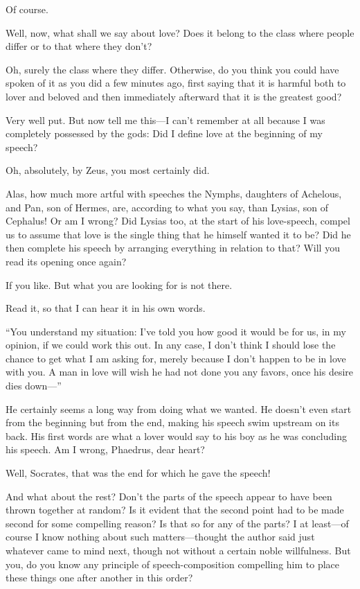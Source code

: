 \sayphaedrus Of course.

\saysocrates Well, now, what shall we say about love? Does it belong to the
class where people differ or to that where they don't?

\sayphaedrus Oh, surely the class where they differ. Otherwise, do you
think you could have spoken of it as you did a few minutes ago, first
saying that it is harmful both to lover and beloved and then immediately
afterward that it is the greatest good?

\saysocrates Very well put. But now tell me this---I can't remember
at all because I was completely possessed by the gods: Did I define love
at the beginning of my speech?

\sayphaedrus Oh, absolutely, by Zeus, you most certainly did.

\saysocrates Alas, how much more artful with speeches the Nymphs, daughters
of Achelous, and Pan, son of Hermes, are, according to what you say,
than Lysias, son of Cephalus! Or am I wrong? Did Lysias too, at 
the start of his love-speech, compel us to assume that love is the
single thing that he himself wanted it to be? Did he then complete his
speech by arranging everything in relation to that? Will you read its
opening once again?

\sayphaedrus If you like. But what you are looking for is not there.

\saysocrates Read it, so that I can hear it in his own words.

\sayphaedrus “You understand my situation: I've told you how good it would
be for us, in my opinion, if we could work this out. In any case, I
don't think I should lose the chance to get what I am asking for, merely
because I don't happen to be in love with you. A man in
love will wish he had not done you any favors, once his desire dies
down---”

\saysocrates He certainly seems a long way from doing what we wanted. He
doesn't even start from the beginning but from the end, making his
speech swim upstream on its back. His first words are what a lover would
say to his boy as he was concluding his speech. Am I wrong, Phaedrus,
dear heart?

\sayphaedrus Well, Socrates, that was the end for which he gave the speech!

\saysocrates And what about the rest? Don't the parts of the speech appear
to have been thrown together at random? Is it evident that the second
point had to be made second for some compelling reason? Is that so for
any of the parts? I at least---of course I know nothing about such
matters---thought the author said just whatever came to mind next,
though not without a certain noble willfulness. But you, do you know any
principle of speech-composition compelling him to place these things one
after another in this order?

